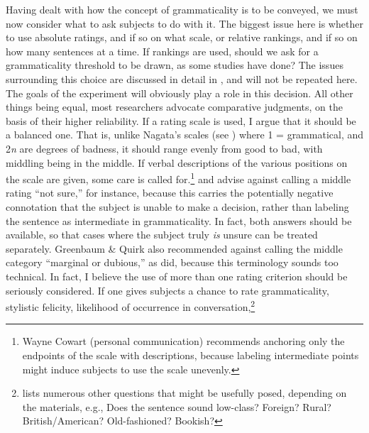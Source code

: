  Having dealt with how the concept of grammaticality is to be conveyed, we must now consider what to ask subjects to do with it. The biggest issue here is whether to use absolute ratings, and if so on what scale, or relative rankings, and if so on how many sentences at a time. If rankings are used, should we ask for a grammaticality threshold to be drawn, as some studies have done? The issues surrounding this choice are discussed in detail in , and will not  be repeated here. The goals of the experiment will obviously play a role in this decision. All other things being equal, most researchers advocate comparative judgments, on the basis of their higher reliability. If a rating scale is used, I argue that it should be a balanced one. That is, unlike Nagata's scales (see ) where 1 = grammatical, and 2\textendash{}\textit{n} are degrees of badness, it should range evenly from good to bad, with middling being in the middle. If verbal descriptions of the various positions on the scale are given, some care is called for.\footnote{Wayne Cowart (personal communication) recommends anchoring only the endpoints of the scale with descriptions, because labeling intermediate points might induce subjects to use the scale unevenly.}
  \citet{GreenbaumEtAl1970} and \citet{Ellis1991} advise against calling a middle rating ``not sure,'' for instance, because this carries the potentially negative connotation that the subject is unable to make a decision, rather than labeling the sentence as intermediate in grammaticality. In fact, both answers should be available, so that cases where
 the subject truly \textit{is} unsure can be treated separately. Greenbaum \& Quirk also recommended against calling the middle category ``marginal or dubious,'' as \citet{QuirkEtAl1966} did, because this terminology sounds too technical. In fact, I believe the use of more than one rating criterion should be seriously considered. If one gives subjects a chance to rate grammaticality, stylistic felicity, likelihood of occurrence in conversation,\footnote{\citet{Householder1973} lists numerous other questions that might be usefully posed, depending on the materials, e.g., Does the sentence sound low-class? Foreign? Rural? British/American? Old-fashioned?  Bookish?}
